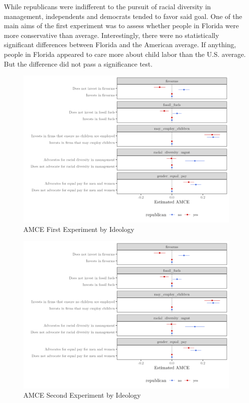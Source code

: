 \documentclass[
  12pt,
]{article}
\begin{document}
While republicans were indifferent to the pursuit of racial diversity in management, independents and democrats tended to favor said goal. One of the main aims of the first experiment was to assess whether people in Florida were more conservative than average. Interestingly, there were no statistically significant differences between Florida and the American average. If anything, people in Florida appeared to care more about child labor than the U.S. average. But the difference did not pass a significance test.

\begin{figure}

{\centering \includegraphics{amce_byr_shorter} 

}

\caption{AMCE First Experiment by Ideology}\label{fig:amce1byr}
\end{figure}

\begin{figure}

{\centering \includegraphics{amce_byr_shorter} 

}

\caption{AMCE Second Experiment by Ideology}\label{fig:amce2byr}
\end{figure}
\end{document}
